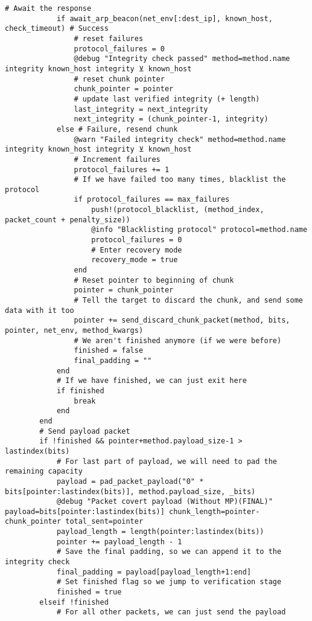 \begin{lstlisting}[language=JuliaLocal, style=julia]
            # Await the response
            if await_arp_beacon(net_env[:dest_ip], known_host, check_timeout) # Success
                # reset failures
                protocol_failures = 0
                @debug "Integrity check passed" method=method.name integrity known_host integrity ⊻ known_host
                # reset chunk pointer
                chunk_pointer = pointer
                # update last verified integrity (+ length)
                last_integrity = next_integrity
                next_integrity = (chunk_pointer-1, integrity)
            else # Failure, resend chunk
                @warn "Failed integrity check" method=method.name integrity known_host integrity ⊻ known_host
                # Increment failures
                protocol_failures += 1
                # If we have failed too many times, blacklist the protocol
                if protocol_failures == max_failures
                    push!(protocol_blacklist, (method_index, packet_count + penalty_size))
                    @info "Blacklisting protocol" protocol=method.name
                    protocol_failures = 0
                    # Enter recovery mode
                    recovery_mode = true
            	end
                # Reset pointer to beginning of chunk
                pointer = chunk_pointer
                # Tell the target to discard the chunk, and send some data with it too
                pointer += send_discard_chunk_packet(method, bits, pointer, net_env, method_kwargs)
                # We aren't finished anymore (if we were before)
                finished = false
                final_padding = ""
            end
            # If we have finished, we can just exit here
            if finished
                break
            end
        end
        # Send payload packet
        if !finished && pointer+method.payload_size-1 > lastindex(bits)
            # For last part of payload, we will need to pad the remaining capacity
            payload = pad_packet_payload("0" * bits[pointer:lastindex(bits)], method.payload_size, _bits)
            @debug "Packet covert payload (Without MP)(FINAL)" payload=bits[pointer:lastindex(bits)] chunk_length=pointer-chunk_pointer total_sent=pointer
            payload_length = length(pointer:lastindex(bits))
            pointer += payload_length - 1
            # Save the final padding, so we can append it to the integrity check
            final_padding = payload[payload_length+1:end]
            # Set finished flag so we jump to verification stage
            finished = true
        elseif !finished
            # For all other packets, we can just send the payload

\end{lstlisting}
